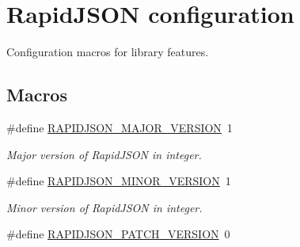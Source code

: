 \hypertarget{group___r_a_p_i_d_j_s_o_n___c_o_n_f_i_g}{}\section{Rapid\+J\+S\+ON configuration}
\label{group___r_a_p_i_d_j_s_o_n___c_o_n_f_i_g}


Configuration macros for library features.  


\subsection*{Macros}
\begin{DoxyCompactItemize}
\item 
\#define \hyperlink{group___r_a_p_i_d_j_s_o_n___c_o_n_f_i_g_gaf1ff1685be6cbebb5d4b2ab997776f45}{R\+A\+P\+I\+D\+J\+S\+O\+N\+\_\+\+M\+A\+J\+O\+R\+\_\+\+V\+E\+R\+S\+I\+ON}~1\hypertarget{group___r_a_p_i_d_j_s_o_n___c_o_n_f_i_g_gaf1ff1685be6cbebb5d4b2ab997776f45}{}\label{group___r_a_p_i_d_j_s_o_n___c_o_n_f_i_g_gaf1ff1685be6cbebb5d4b2ab997776f45}

\begin{DoxyCompactList}\small\item\em Major version of Rapid\+J\+S\+ON in integer. \end{DoxyCompactList}\item 
\#define \hyperlink{group___r_a_p_i_d_j_s_o_n___c_o_n_f_i_g_gaf9125105c593a636a79f1c2d96835376}{R\+A\+P\+I\+D\+J\+S\+O\+N\+\_\+\+M\+I\+N\+O\+R\+\_\+\+V\+E\+R\+S\+I\+ON}~1\hypertarget{group___r_a_p_i_d_j_s_o_n___c_o_n_f_i_g_gaf9125105c593a636a79f1c2d96835376}{}\label{group___r_a_p_i_d_j_s_o_n___c_o_n_f_i_g_gaf9125105c593a636a79f1c2d96835376}

\begin{DoxyCompactList}\small\item\em Minor version of Rapid\+J\+S\+ON in integer. \end{DoxyCompactList}\item 
\#define \hyperlink{group___r_a_p_i_d_j_s_o_n___c_o_n_f_i_g_gaf967d31be43666ce7f53756d73bd1cdf}{R\+A\+P\+I\+D\+J\+S\+O\+N\+\_\+\+P\+A\+T\+C\+H\+\_\+\+V\+E\+R\+S\+I\+ON}~0\hypertarget{group___r_a_p_i_d_j_s_o_n___c_o_n_f_i_g_gaf967d31be43666ce7f53756d73bd1cdf}{}\label{group___r_a_p_i_d_j_s_o_n___c_o_n_f_i_g_gaf967d31be43666ce7f53756d73bd1cdf}


\end{DoxyCompactItemize}

